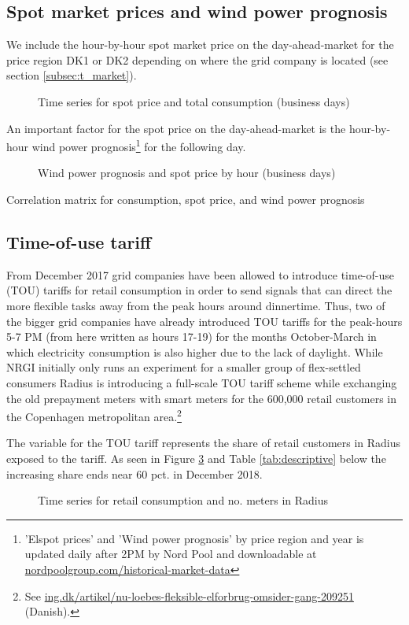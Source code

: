 \subsection{Spot market prices and wind power prognosis}
\label{subsec:d_spot}
We include the hour-by-hour spot market price on the day-ahead-market for the price region DK1 or DK2 depending on where the grid company is located (see section \ref{subsec:t_market}).
\begin{figure}[H]
  \centering
  \caption{Time series for spot price and total consumption (business days)}
  \label{fig:price_cons_time_series}
\end{figure}
An important factor for the spot price on the day-ahead-market is the hour-by-hour wind power prognosis\footnote{'Elspot prices' and 'Wind power prognosis' by price region and year is updated daily after 2PM by Nord Pool and downloadable at \href{https://www.nordpoolgroup.com/historical-market-data/}{nordpoolgroup.com/historical-market-data}} for the following day.
\begin{figure}[H]
  \centering
  \caption{Wind power prognosis and spot price by hour (business days)}
  \label{fig:wp_price_hour}
\end{figure}

\begin{table}[H]
  \centering
  \caption{Correlation matrix for consumption, spot price, and wind power prognosis}
  \footnotesize
  \label{tab:correlation}
\end{table}


\subsection{Time-of-use tariff}
\label{subsec:d_tout}
From December 2017 grid companies have been allowed to introduce time-of-use (TOU) tariffs for retail consumption in order to send signals that can direct the more flexible tasks away from the peak hours around dinnertime. Thus, two of the bigger grid companies have already introduced TOU tariffs for the peak-hours 5-7 PM (from here written as hours 17-19) for the months October-March in which electricity consumption is also higher due to the lack of daylight. While NRGI initially only runs an experiment for a smaller group of flex-settled consumers Radius is introducing a full-scale TOU tariff scheme while exchanging the old prepayment meters with smart meters for the 600,000 retail customers in the Copenhagen metropolitan area.\footnote{See \href{https://ing.dk/artikel/nu-loebes-fleksible-elforbrug-omsider-gang-209251}{ing.dk/artikel/nu-loebes-fleksible-elforbrug-omsider-gang-209251} (Danish).}
\par
The variable for the TOU tariff represents the share of retail customers in Radius exposed to the tariff. As seen in Figure \ref{fig:cons_meters_time_series} and Table \ref{tab:descriptive} below the increasing share ends near 60 pct. in December 2018.
\begin{figure}[H]
  \centering
  \caption{Time series for retail consumption and no. meters in Radius}
  \label{fig:cons_meters_time_series}
\end{figure}

